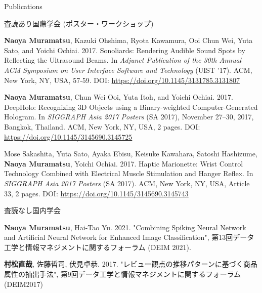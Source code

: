 \documentclass{resume} %
\begin{document}
\begin{rSection}{Publications}
\begin{rSubsection}{査読あり国際学会 (ポスター・ワークショップ)}{}{}{}{}
        \item \textbf{Naoya Muramatsu}, Kazuki Ohshima, Ryota Kawamura, Ooi Chun Wei, Yuta Sato, and Yoichi Ochiai. 2017. Sonoliards: Rendering Audible Sound Spots by Reflecting the Ultrasound Beams. In \textit{Adjunct Publication of the 30th Annual ACM Symposium on User Interface Software and Technology} (UIST ’17). ACM, New York, NY, USA, 57-59. DOI: \url{https://doi.org/10.1145/3131785.3131807}

        \item \textbf{Naoya Muramatsu}, Chun Wei Ooi, Yuta Itoh, and Yoichi Ochiai. 2017. DeepHolo: Recognizing 3D Objects using a Binary-weighted Computer-Generated Hologram. In \textit{SIGGRAPH Asia 2017 Posters} (SA 2017), November 27--30, 2017, Bangkok, Thailand. ACM, New York, NY, USA, 2 pages. DOI: \url{https://doi.org/10.1145/3145690.3145725}

        \item Mose Sakashita, Yuta Sato, Ayaka Ebisu, Keisuke Kawahara, Satoshi Hashizume, \textbf{Naoya Muramatsu}, Yoichi Ochiai. 2017. Haptic Marionette: Wrist Control Technology Combined with Electrical Muscle Stimulation and Hanger Reflex. In \textit{SIGGRAPH Asia 2017 Posters} (SA 2017). ACM, New York, NY, USA, Article 33, 2 pages. DOI: \url{https://doi.org/10.1145/3145690.3145743}
    \end{rSubsection}



    \begin{rSubsection}{査読なし国内学会}{}{}{}{}
        \item \textbf{Naoya Muramatsu}, Hai-Tao Yu. 2021. "Combining Spiking Neural Network and Artificial Neural Network for Enhanced Image Classification", 第13回データ工学と情報マネジメントに関するフォーラム (DEIM 2021).
        \item \textbf{村松直哉}, 佐藤哲司, 伏見卓恭. 2017. "レビュー観点の推移パターンに基づく商品属性の抽出手法", 第9回データ工学と情報マネジメントに関するフォーラム (DEIM2017)
    \end{rSubsection}




\end{rSection}
\end{document}

